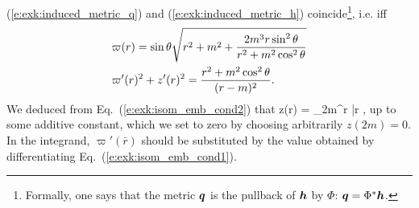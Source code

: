 (\ref{e:exk:induced_metric_q}) and (\ref{e:exk:induced_metric_h})
coincide\footnote{Formally, one says that the metric $\bm{q}$ is the pullback
of $\bm{h}$ by $\Phi$: $\bm{q} = \Phi^* \bm{h}$.}, i.e. iff
\begin{subequations}
\begin{align}
    & \varpi(r) = \sin\theta \sqrt{r^2 + m^2 + \frac{2 m^3 r \sin^2\theta}{r^2 + m^2\cos^2\theta} }
        \label{e:exk:isom_emb_cond1} \\
    &\varpi'(r)^2 + z'(r)^2 = \frac{r^2 + m^2\cos^2\theta}{(r-m)^2}  . \label{e:exk:isom_emb_cond2}
\end{align}
\end{subequations}
We deduced from Eq.~(\ref{e:exk:isom_emb_cond2}) that
\be \label{e:exk:isom_emb_z_r}
    z(r) = \int_{2m}^r
     \; \D \bar{r} ,
\ee
up to some additive constant, which we set to zero by choosing arbitrarily $z(2m) = 0$.
In the integrand, $\varpi'(\bar{r})$ should be substituted by the value obtained
by differentiating Eq.~(\ref{e:exk:isom_emb_cond1}).

